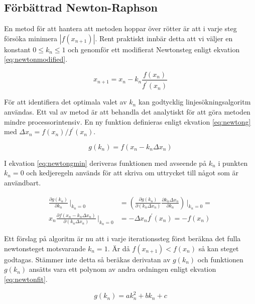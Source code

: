 \subsection{Förbättrad Newton-Raphson}

En metod för att hantera att metoden hoppar över rötter är att i varje steg försöka minimera $|f(x_{n+1})|$.
Rent praktiskt innbär detta att vi väljer en konstant $0 \le k_n \le 1$ och genomför ett modifierat
Newtonsteg enligt ekvation \eqref{eq:newtonmodified}.

\begin{equation}
\label{eq:newtonmodified}
x_{n+1} = x_n - k_n\frac{f(x_n)}{f^\prime(x_n)}
\end{equation}

\noindent
För att identifiera det optimala valet av $k_n$ kan godtycklig linjesökningsalgoritm användas. Ett val av metod
är att behandla det analytiskt för att göra metoden mindre processorintensiv. En ny funktion definieras
enligt ekvation \eqref{eq:newtong} med $\Delta x_n = f(x_n)/f^\prime(x_n)$.

\begin{equation}
\label{eq:newtong}
g(k_n) = f(x_n- k_n\Delta x_n)
\end{equation}

\noindent
I ekvation \eqref{eq:newtongmin} deriveras funktionen med avseende på $k_n$ i punkten $k_n=0$
och kedjeregeln används för att skriva om uttrycket till något som är användbart.

\begin{align}
\frac{\partial g(k_n)}{\partial k_n}\,\bigg|_{k_n=0} & = 
\left(\frac{\partial g(k_n)}{\partial (k_n\Delta x_n)}
\frac{\partial k_n \Delta x_n}{\partial k_n}\right)\,\bigg|_{k_n=0} = \nonumber \\
x_n \frac{\partial f(x_n- k_n\Delta x_n)}{\partial (k_n\Delta x_n)}\,\bigg|_{k_n=0} & = 
-\Delta x_n f^\prime(x_n) = - f(x_n)
\label{eq:newtongmin}
\end{align}

\noindent
Ett förslag på algoritm är nu att i varje iterationssteg först beräkna det fulla newtonsteget motsvarande $k_n=1$.
Är då $f(x_{n+1}) < f(x_n)$ så kan steget godtagas. Stämmer inte detta så beräkas derivatan av $g(k_n)$ och
funktionen $g(k_n)$ ansätts vara ett polynom av andra ordningen enligt ekvation \eqref{eq:newtonfit}.

\begin{equation}
\label{eq:newtonfit}
g(k_n) = ak^2_n + bk_n + c
\end{equation}

